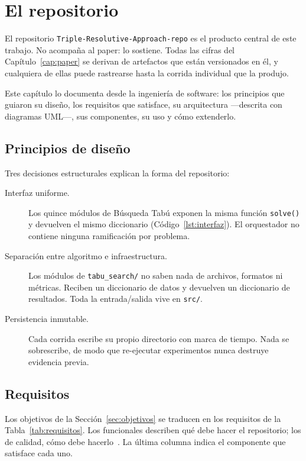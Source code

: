 \chapter{El repositorio}
\label{cap:repositorio}

El repositorio \texttt{Triple-Resolutive-Approach-repo} es el producto
central de este trabajo. No acompaña al paper: lo sostiene. Todas las cifras
del Capítulo~\ref{cap:paper} se derivan de artefactos que están versionados
en él, y cualquiera de ellas puede rastrearse hasta la corrida individual que
la produjo.

Este capítulo lo documenta desde la ingeniería de software: los principios
que guiaron su diseño, los requisitos que satisface, su arquitectura
—descrita con diagramas UML—, sus componentes, su uso y cómo extenderlo.

\section{Principios de diseño}

Tres decisiones estructurales explican la forma del repositorio:

\begin{description}
  \item[Interfaz uniforme.] Los quince módulos de Búsqueda Tabú exponen la
    misma función \texttt{solve()} y devuelven el mismo diccionario
    (Código~\ref{lst:interfaz}). El orquestador no contiene ninguna
    ramificación por problema.
  \item[Separación entre algoritmo e infraestructura.] Los módulos de
    \texttt{tabu\_search/} no saben nada de archivos, formatos ni métricas.
    Reciben un diccionario de datos y devuelven un diccionario de resultados.
    Toda la entrada/salida vive en \texttt{src/}.
  \item[Persistencia inmutable.] Cada corrida escribe su propio directorio con
    marca de tiempo. Nada se sobrescribe, de modo que re-ejecutar experimentos
    nunca destruye evidencia previa.
\end{description}

\section{Requisitos}
\label{sec:requisitos}

Los objetivos de la Sección~\ref{sec:objetivos} se traducen en los requisitos
de la Tabla~\ref{tab:requisitos}. Los funcionales describen qué debe hacer el
repositorio; los de calidad, cómo debe hacerlo~\cite{bass2012software}. La
última columna indica el componente que satisface cada uno.

